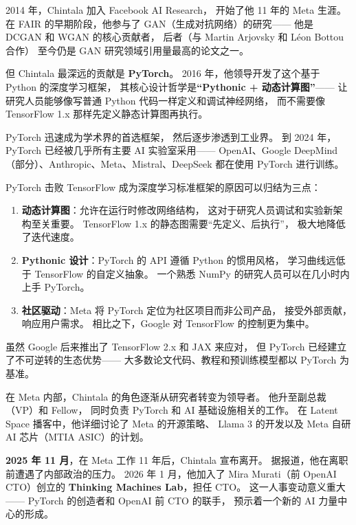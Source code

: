 2014 年，Chintala 加入 Facebook AI Research，
开始了他 11 年的 Meta 生涯。
在 FAIR 的早期阶段，他参与了 GAN（生成对抗网络）的研究——
他是 DCGAN 和 WGAN 的核心贡献者，
后者（与 Martin Arjovsky 和 L\'eon Bottou 合作）
至今仍是 GAN 研究领域引用量最高的论文之一。

但 Chintala 最深远的贡献是 \textbf{PyTorch}。
2016 年，他领导开发了这个基于 Python 的深度学习框架，
其核心设计哲学是\textbf{``Pythonic + 动态计算图''}——
让研究人员能够像写普通 Python 代码一样定义和调试神经网络，
而不需要像 TensorFlow 1.x 那样先定义静态计算图再执行。

PyTorch 迅速成为学术界的首选框架，
然后逐步渗透到工业界。
到 2024 年，PyTorch 已经被几乎所有主要 AI 实验室采用——
OpenAI、Google DeepMind（部分）、Anthropic、Meta、Mistral、DeepSeek
都在使用 PyTorch 进行训练。

\begin{keybox}
PyTorch 击败 TensorFlow 成为深度学习标准框架的原因可以归结为三点：
\begin{enumerate}
  \item \textbf{动态计算图}：允许在运行时修改网络结构，
    这对于研究人员调试和实验新架构至关重要。
    TensorFlow 1.x 的静态图需要``先定义、后执行''，
    极大地降低了迭代速度。
  \item \textbf{Pythonic 设计}：PyTorch 的 API 遵循 Python 的惯用风格，
    学习曲线远低于 TensorFlow 的自定义抽象。
    一个熟悉 NumPy 的研究人员可以在几小时内上手 PyTorch。
  \item \textbf{社区驱动}：Meta 将 PyTorch 定位为社区项目而非公司产品，
    接受外部贡献，响应用户需求。
    相比之下，Google 对 TensorFlow 的控制更为集中。
\end{enumerate}
虽然 Google 后来推出了 TensorFlow 2.x 和 JAX 来应对，
但 PyTorch 已经建立了不可逆转的生态优势——
大多数论文代码、教程和预训练模型都以 PyTorch 为基准。
\end{keybox}

在 Meta 内部，Chintala 的角色逐渐从研究者转变为领导者。
他升至副总裁（VP）和 Fellow，
同时负责 PyTorch 和 AI 基础设施相关的工作。
在 Latent Space 播客中，他详细讨论了 Meta 的开源策略、
Llama 3 的开发以及 Meta 自研 AI 芯片（MTIA ASIC）的计划。

\textbf{2025 年 11 月}，在 Meta 工作 11 年后，Chintala 宣布离开。
据报道，他在离职前遭遇了内部政治的压力。
2026 年 1 月，他加入了 Mira Murati（前 OpenAI CTO）创立的
\textbf{Thinking Machines Lab}，担任 CTO。
这一人事变动意义重大——
PyTorch 的创造者和 OpenAI 前 CTO 的联手，
预示着一个新的 AI 力量中心的形成。

